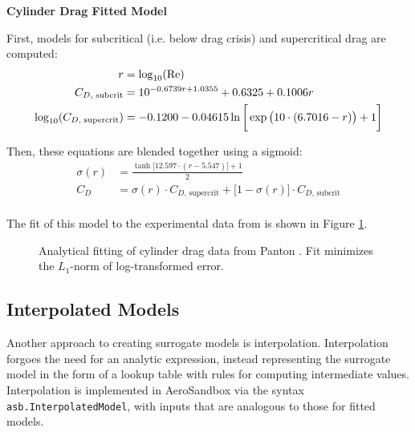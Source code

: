 \begin{example}
    \noindent
    \textbf{Cylinder Drag Fitted Model}

    \noindent
    First, models for subcritical (i.e. below drag crisis) and supercritical drag are computed:
    \begin{equation*}
        \begin{aligned}
            r &= \log_{10}(\text{Re}) \\
            C_{D\text{, subcrit}} &= 10^ {-0.6739 r + 1.0355} + 0.6325 + 0.1006 r \\
            \log_{10}(C_{D\text{, supercrit}}) &= -0.1200 - 0.04615 \ln\bigg[\exp\big(10 \cdot (6.7016 - r)\big) + 1 \bigg] \\
        \end{aligned}
    \end{equation*}

    \noindent
    Then, these equations are blended together using a sigmoid:
    \begin{equation}
        \begin{aligned}
            \sigma(r) &= \frac{\tanh \big[12.597 \cdot (r - 5.547)\big] + 1}{2} \\
            C_D &= \sigma(r) \cdot C_{D\text{, supercrit}} + \big[1 - \sigma(r)\big] \cdot C_{D\text{, subcrit}} \\
        \end{aligned}
    \end{equation}
\end{example}

\noindent
The fit of this model to the experimental data from \cite{Panton} is shown in Figure \ref{fig:cylinder-drag}.

\begin{figure}[H]
    \centering
    \ifdraft{}{\centerline{}}
    \caption{Analytical fitting of cylinder drag data from Panton \cite{Panton}. Fit minimizes the $L_1$-norm of log-transformed error.}
    \label{fig:cylinder-drag}
\end{figure}

\subsection{Interpolated Models}
\label{sect:interpolation}

Another approach to creating surrogate models is interpolation. Interpolation forgoes the need for an analytic expression, instead representing the surrogate model in the form of a lookup table with rules for computing intermediate values. Interpolation is implemented in AeroSandbox via the syntax \texttt{asb.InterpolatedModel}, with inputs that are analogous to those for fitted models.

